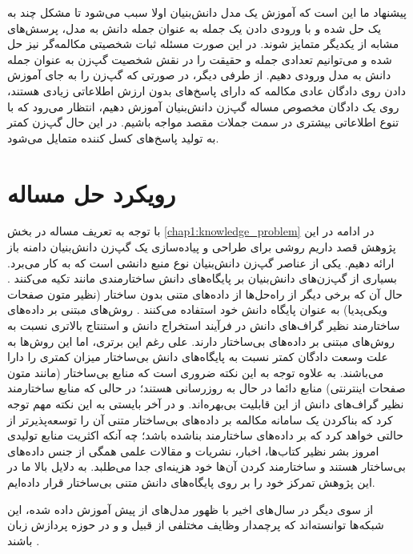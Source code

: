پیشنهاد ما این است که آموزش یک مدل دانش‌بنیان اولا سبب می‌شود تا مشکل چند به یک حل شده و با ورودی دادن یک جمله به عنوان جمله دانش به مدل، پرسش‌های مشابه از یکدیگر متمایز شوند. در این صورت مسئله ثبات شخصیتی مکالمه‌گر نیز حل شده و می‌توانیم تعدادی جمله و حقیقت را در نقش شخصیت گپ‌زن به عنوان جمله دانش به مدل ورودی دهیم. از طرفی دیگر، در صورتی که گپ‌زن را به جای آموزش دادن روی دادگان عادی مکالمه که دارای پاسخ‌های بدون ارزش اطلاعاتی زیادی هستند، روی یک دادگان مخصوص مساله گپ‌زن دانش‌بنیان آموزش دهیم، انتظار می‌رود که با تنوع اطلاعاتی بیشتری در سمت جملات مقصد مواجه باشیم. در این حال گپ‌زن کمتر به تولید پاسخ‌های کسل کننده متمایل می‌شود. 


\section{رویکرد حل مساله} \label{chap1:problem_solving_approach}

با توجه به تعریف مساله در بخش 
\ref{chap1:knowledge_problem}
در ادامه  در این پژوهش قصد داریم روشی برای طراحی و پیاده‌سازی یک گپ‌زن دانش‌بنیان دامنه باز ارائه دهیم. 
یکی از عناصر گپ‌زن دانش‌بنیان نوع منبع دانشی است که به کار می‌برد. بسیاری از گپ‌زن‌های دانش‌بنیان بر پایگاه‌های دانش ساختارمندی مانند 
تکیه می‌کنند
\cite{zhou2018commonsense, tuan2019dykgchat}.
حال آن که برخی دیگر از راه‌حل‌ها از داده‌های متنی بدون ساختار (نظیر متون صفحات ویکی‌پدیا) به عنوان پایگاه دانش خود استفاده می‌کنند
\cite{wizard,a_knowledge_grounded,Topical_Chat}.
 روش‌های مبتنی بر داده‌های ساختارمند نظیر گراف‌های دانش در فرآیند استخراج دانش و استنتاج 
بالاتری نسبت به روش‌های مبتنی بر داده‌های بی‌ساختار دارند.
علی رغم این برتری، اما این روش‌ها به علت وسعت دادگان کمتر نسبت به پایگاه‌های دانش بی‌ساختار میزان
کمتری را دارا می‌باشند.
به علاوه توجه به این نکته ضروری است که منابع بی‌ساختار (مانند متون صفحات اینترنتی) منابع دائما در حال به روزرسانی هستند؛ در حالی که منابع ساختارمند نظیر گراف‌های‌ دانش از این قابلیت بی‌بهره‌اند. 
و در آخر بایستی به این نکته مهم توجه کرد که بناکردن یک سامانه مکالمه بر داده‌های بی‌ساختار متنی آن را توسعه‌پذیرتر از حالتی خواهد کرد که بر داده‌های ساختارمند بناشده باشد؛ چه آنکه اکثریت منابع تولیدی امروز بشر نظیر کتاب‌ها، اخبار، نشریات و مقالات علمی همگی از جنس‌ داده‌های بی‌ساختار هستند و ساختارمند کردن آن‌ها خود هزینه‌ای جدا می‌طلبد.
به دلایل بالا ما در این پژوهش تمرکز خود را بر روی پایگاه‌های دانش متنی بی‌ساختار قرار داده‌ایم.

از سوی دیگر در سال‌های اخیر با ظهور مدل‌های از پیش آموزش داده شده،
این شبکه‌ها توانسته‌اند که پرچمدار
 وظایف مختلفی از قبیل
و
و
  در حوزه پردازش زبان باشند
\cite{bert, gpt2}.


